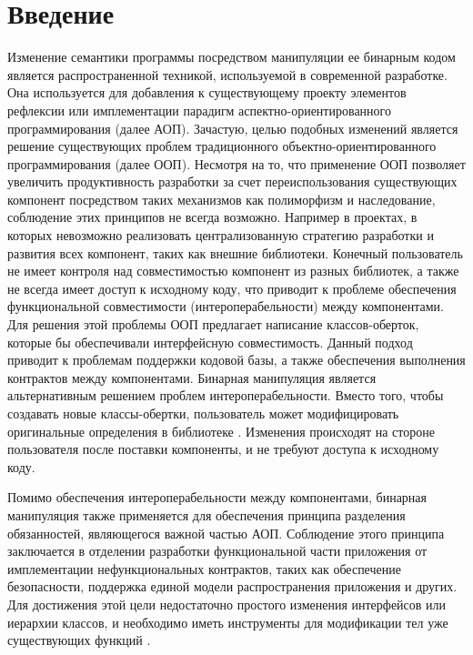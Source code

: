 \section{Введение}
\label{sec:Chapter0} 

\sloppy

Изменение семантики программы посредством манипуляции ее бинарным кодом является распространенной техникой, используемой в современной разработке. Она используется для добавления к существующему проекту элементов рефлексии или имплементации парадигм аспектно-ориентированного программирования (далее АОП). Зачастую, целью подобных изменений является решение существующих проблем традиционного объектно-ориентированного программирования (далее ООП). Несмотря на то, что применение ООП позволяет увеличить продуктивность разработки за счет переиспользования существующих компонент посредством таких механизмов как полиморфизм и наследование, соблюдение этих принципов не всегда возможно. Например в проектах, в которых невозможно реализовать централизованную стратегию разработки и развития всех компонент, таких как внешние библиотеки. Конечный пользователь не имеет контроля над совместимостью компонент из разных библиотек, а также не всегда имеет доступ к исходному коду, что приводит к проблеме обеспечения функциональной совместимости (интероперабельности) между компонентами. Для решения этой проблемы ООП предлагает написание классов-оберток, которые бы обеспечивали интерфейсную совместимость. Данный подход приводит к проблемам поддержки кодовой базы, а также обеспечения выполнения контрактов между компонентами. Бинарная манипуляция является альтернативным решением проблем интероперабельности. Вместо того, чтобы создавать новые классы-обертки, пользователь может модифицировать оригинальные определения в библиотеке \cite{bca}. Изменения происходят на стороне пользователя после поставки компоненты, и не требуют доступа к исходному коду.

Помимо обеспечения интероперабельности между компонентами, бинарная манипуляция также применяется для обеспечения принципа разделения обязанностей, являющегося важной частью АОП. Соблюдение этого принципа заключается в отделении разработки функциональной части приложения от имплементации нефункциональных контрактов, таких как обеспечение безопасности, поддержка единой модели распространения приложения и других. Для достижения этой цели недостаточно простого изменения интерфейсов или иерархии классов, и необходимо иметь инструменты для модификации тел уже существующих функций \cite{tanter2002}.

